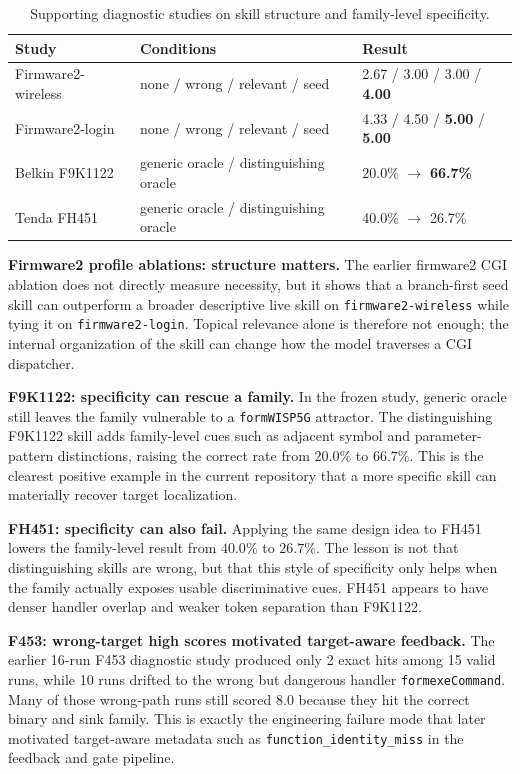 ﻿\documentclass[preprint,12pt]{elsarticle}
\begin{document}
\begin{table}[t]
\centering
\caption{Supporting diagnostic studies on skill structure and family-level specificity.}
\label{tab:diagnostic_results}
\footnotesize
\begin{tabular}{l l l}
\toprule
Study & Conditions & Result \\
\midrule
Firmware2-wireless & none / wrong / relevant / seed & 2.67 / 3.00 / 3.00 / \textbf{4.00} \\
Firmware2-login & none / wrong / relevant / seed & 4.33 / 4.50 / \textbf{5.00} / \textbf{5.00} \\
Belkin F9K1122 & generic oracle / distinguishing oracle & 20.0\% $\rightarrow$ \textbf{66.7\%} \\
Tenda FH451 & generic oracle / distinguishing oracle & 40.0\% $\rightarrow$ 26.7\% \\
\bottomrule
\end{tabular}
\end{table}

\textbf{Firmware2 profile ablations: structure matters.}
The earlier firmware2 CGI ablation does not directly measure necessity, but
it shows that a branch-first seed skill can outperform a broader
descriptive live skill on \texttt{firmware2-wireless} while tying it on
\texttt{firmware2-login}.  Topical relevance alone is therefore not enough;
the internal organization of the skill can change how the model traverses a
CGI dispatcher.

\textbf{F9K1122: specificity can rescue a family.}
In the frozen study, generic oracle still leaves the family vulnerable to a
\texttt{formWISP5G} attractor.  The distinguishing F9K1122 skill adds
family-level cues such as adjacent symbol and parameter-pattern
distinctions, raising the correct rate from $20.0\%$ to $66.7\%$.  This is
the clearest positive example in the current repository that a more
specific skill can materially recover target localization.

\textbf{FH451: specificity can also fail.}
Applying the same design idea to FH451 lowers the family-level result from
$40.0\%$ to $26.7\%$.  The lesson is not that distinguishing skills are
wrong, but that this style of specificity only helps when the family
actually exposes usable discriminative cues.  FH451 appears to have denser
handler overlap and weaker token separation than F9K1122.

\textbf{F453: wrong-target high scores motivated target-aware feedback.}
The earlier 16-run F453 diagnostic study produced only 2 exact hits among
15 valid runs, while 10 runs drifted to the wrong but dangerous handler
\texttt{formexeCommand}.  Many of those wrong-path runs still scored 8.0
because they hit the correct binary and sink family.  This is exactly the
engineering failure mode that later motivated target-aware metadata such as
\texttt{function\_identity\_miss} in the feedback and gate pipeline.
\end{document}
